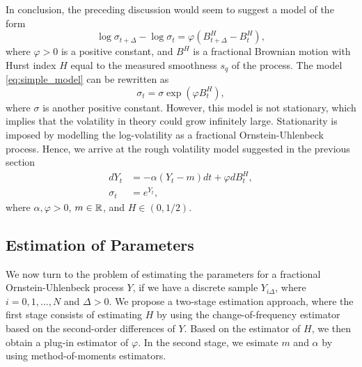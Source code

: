 In conclusion, the preceding discussion would seem to suggest a model of the form
\begin{equation}\label{eq:simple_model}
    \log \sigma_{t+\Delta} - \log \sigma_{t} = \varphi(B^{H}_{t+\Delta}-B^{H}_{t}),
\end{equation}
where $\varphi >0$ is a positive constant, and $B^{H}$ is a fractional Brownian motion with Hurst index $H$ equal to the measured smoothness $s_{q}$ of the process. The model \eqref{eq:simple_model} can be rewritten as 
\begin{equation}
    \sigma_{t}=\sigma \exp\left(\varphi B_{t}^{H}\right),
\end{equation}
where $\sigma$ is another positive constant. However, this model is not stationary, which implies that the volatility in theory could grow infinitely large. Stationarity is imposed by modelling the log-volatility as a fractional Ornstein-Uhlenbeck process. Hence, we arrive at the rough volatility model suggested in the previous section
\begin{align}
    dY_{t}&= -\alpha(Y_{t}-m)dt + \varphi dB^{H}_{t},\\
    \sigma_{t} &= e^{Y_{t}},
\end{align}
where $\alpha,\varphi>0$, $m\in \mathbb{R}$, and $H\in (0,1/2)$.
\subsection{Estimation of Parameters}
We now turn to the problem of estimating the parameters for a fractional Ornstein-Uhlenbeck process $Y$, if we have a discrete sample $Y_{i\Delta}$, where $i=0,1,\dots,N$ and $\Delta>0$. We propose a two-stage estimation approach, where the first stage consists of estimating $H$ by using the change-of-frequency estimator based on the second-order differences of $Y$. Based on the estimator of $H$, we then obtain a plug-in estimator of $\varphi$. In the second stage, we esimate $m$ and $\alpha$ by using method-of-moments estimators. 

